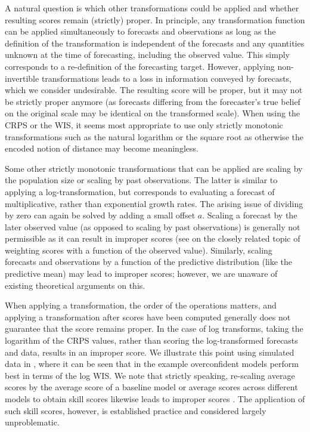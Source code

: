 \documentclass[10pt,letterpaper]{article}
\begin{document}
A natural question is which other transformations could be applied and whether resulting scores remain (strictly) proper. In principle, any transformation function can be applied simultaneously to forecasts and observations as long as the definition of the transformation is independent of the forecasts and any quantities unknown at the time of forecasting, including the observed value. This simply corresponds to a re-definition of the forecasting target. However, applying non-invertible transformations leads to a loss in information conveyed by forecasts, which we consider undesirable. The resulting score will be proper, but it may not be strictly proper anymore (as forecasts differing from the forecaster's true belief on the original scale may be identical on the transformed scale). When using the CRPS or the WIS, it seems most appropriate to use only strictly monotonic transformations such as the natural logarithm or the square root as otherwise the encoded notion of distance may become meaningless. 

Some other strictly monotonic transformations that can be applied are scaling by the population size or scaling by past observations. The latter is similar to applying a log-transformation, but corresponds to evaluating a forecast of multiplicative, rather than exponential growth rates. The arising issue of dividing by zero can again be solved by adding a small offset $a$. Scaling a forecast by the later observed value (as opposed to scaling by past observations) is generally not permissible as it can result in improper scores (see \cite{lerchForecasterDilemmaExtreme2015} on the closely related topic of weighting scores with a function of the observed value). Similarly, scaling forecasts and observations by a function of the predictive distribution (like the predictive mean) may lead to improper scores; however, we are unaware of existing theoretical arguments on this. 

When applying a transformation, the order of the operations matters, and applying a transformation after scores have been computed generally does not guarantee that the score remains proper. In the case of log transforms, taking the logarithm of the CRPS values, rather than scoring the log-transformed forecasts and data, results in an improper score. We illustrate this point using simulated data in , where it can be seen that in the example overconfident models perform best in terms of the log WIS. We note that strictly speaking, re-scaling average scores by the average score of a baseline model or average scores across different models  to obtain skill scores likewise leads to improper scores \cite{gneitingStrictlyProperScoring2007}. The application of such skill scores, however, is established practice and considered largely unproblematic.
\end{document}
